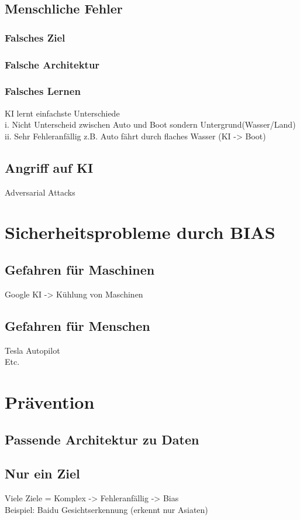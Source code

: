 \documentclass[12pt,oneside,a4paper,parskip]{scrbook}
\begin{document}
\section{Menschliche Fehler}
\subsection{Falsches Ziel}
\subsection{Falsche Architektur}
\subsection{Falsches Lernen}
KI lernt einfachste Unterschiede
\\i.	Nicht Unterscheid zwischen Auto und Boot sondern Untergrund(Wasser/Land)
\\ii.	Sehr Fehleranfällig z.B. Auto fährt durch flaches Wasser (KI -> Boot)
\section{Angriff auf KI}
Adversarial Attacks
\chapter{Sicherheitsprobleme durch BIAS}
\section{Gefahren für Maschinen}
Google KI -> Kühlung von Maschinen
\section{Gefahren für Menschen}
Tesla Autopilot
\\Etc.

\chapter{Prävention }
\label{chapter:main}
\section{Passende Architektur zu Daten}

\section{Nur ein Ziel}
Viele Ziele = Komplex -> Fehleranfällig -> Bias
\\Beispiel: Baidu Gesichtserkennung (erkennt nur Asiaten)
\end{document}
